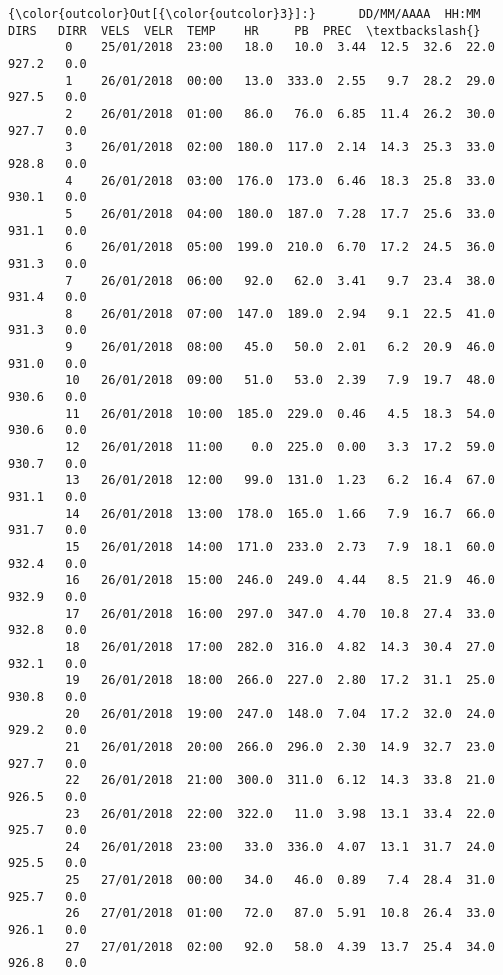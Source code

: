 \documentclass[11pt]{article}
\begin{document}
\begin{Verbatim}[commandchars=\\\{\}]
{\color{outcolor}Out[{\color{outcolor}3}]:}      DD/MM/AAAA  HH:MM   DIRS   DIRR  VELS  VELR  TEMP    HR     PB  PREC  \textbackslash{}
        0    25/01/2018  23:00   18.0   10.0  3.44  12.5  32.6  22.0  927.2   0.0   
        1    26/01/2018  00:00   13.0  333.0  2.55   9.7  28.2  29.0  927.5   0.0   
        2    26/01/2018  01:00   86.0   76.0  6.85  11.4  26.2  30.0  927.7   0.0   
        3    26/01/2018  02:00  180.0  117.0  2.14  14.3  25.3  33.0  928.8   0.0   
        4    26/01/2018  03:00  176.0  173.0  6.46  18.3  25.8  33.0  930.1   0.0   
        5    26/01/2018  04:00  180.0  187.0  7.28  17.7  25.6  33.0  931.1   0.0   
        6    26/01/2018  05:00  199.0  210.0  6.70  17.2  24.5  36.0  931.3   0.0   
        7    26/01/2018  06:00   92.0   62.0  3.41   9.7  23.4  38.0  931.4   0.0   
        8    26/01/2018  07:00  147.0  189.0  2.94   9.1  22.5  41.0  931.3   0.0   
        9    26/01/2018  08:00   45.0   50.0  2.01   6.2  20.9  46.0  931.0   0.0   
        10   26/01/2018  09:00   51.0   53.0  2.39   7.9  19.7  48.0  930.6   0.0   
        11   26/01/2018  10:00  185.0  229.0  0.46   4.5  18.3  54.0  930.6   0.0   
        12   26/01/2018  11:00    0.0  225.0  0.00   3.3  17.2  59.0  930.7   0.0   
        13   26/01/2018  12:00   99.0  131.0  1.23   6.2  16.4  67.0  931.1   0.0   
        14   26/01/2018  13:00  178.0  165.0  1.66   7.9  16.7  66.0  931.7   0.0   
        15   26/01/2018  14:00  171.0  233.0  2.73   7.9  18.1  60.0  932.4   0.0   
        16   26/01/2018  15:00  246.0  249.0  4.44   8.5  21.9  46.0  932.9   0.0   
        17   26/01/2018  16:00  297.0  347.0  4.70  10.8  27.4  33.0  932.8   0.0   
        18   26/01/2018  17:00  282.0  316.0  4.82  14.3  30.4  27.0  932.1   0.0   
        19   26/01/2018  18:00  266.0  227.0  2.80  17.2  31.1  25.0  930.8   0.0   
        20   26/01/2018  19:00  247.0  148.0  7.04  17.2  32.0  24.0  929.2   0.0   
        21   26/01/2018  20:00  266.0  296.0  2.30  14.9  32.7  23.0  927.7   0.0   
        22   26/01/2018  21:00  300.0  311.0  6.12  14.3  33.8  21.0  926.5   0.0   
        23   26/01/2018  22:00  322.0   11.0  3.98  13.1  33.4  22.0  925.7   0.0   
        24   26/01/2018  23:00   33.0  336.0  4.07  13.1  31.7  24.0  925.5   0.0   
        25   27/01/2018  00:00   34.0   46.0  0.89   7.4  28.4  31.0  925.7   0.0   
        26   27/01/2018  01:00   72.0   87.0  5.91  10.8  26.4  33.0  926.1   0.0   
        27   27/01/2018  02:00   92.0   58.0  4.39  13.7  25.4  34.0  926.8   0.0   

\end{Verbatim}
\end{document}
